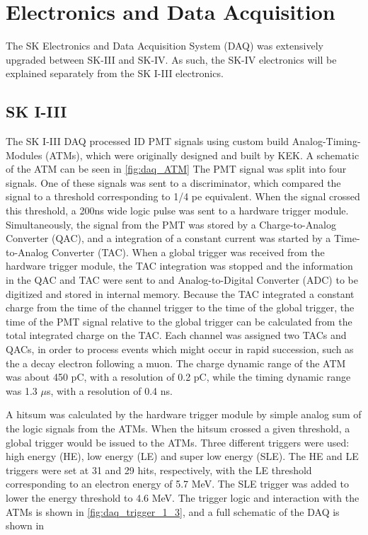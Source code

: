 \section{Electronics and Data Acquisition}
\label{sec:daq}
The SK Electronics and Data Acquisition System (DAQ) was extensively upgraded between SK-III and SK-IV.  As such, the SK-IV electronics will be explained separately from the SK I-III electronics.
\subsection{SK I-III}
\label{subsec:sk_1_3_daq}
The SK I-III DAQ processed ID PMT signals using custom build Analog-Timing-Modules (ATMs), which were originally designed and built by KEK.   A schematic of the ATM can be seen in \cref{fig:daq_ATM}  The PMT signal was split into four signals.  One of these signals was sent to a discriminator, which compared the signal to a threshold corresponding to 1/4 pe equivalent.  When the signal crossed this threshold, a 200ns wide logic pulse was sent to a hardware trigger module.  Simultaneously, the signal from the PMT was stored by a Charge-to-Analog Converter (QAC), and a integration of a constant current was started by a Time-to-Analog Converter (TAC).  When a global trigger was received from the hardware trigger module, the TAC integration was stopped and the information in the QAC and TAC were sent to and Analog-to-Digital Converter (ADC) to be digitized and stored in internal memory.  Because the TAC integrated a constant charge from the time of the channel trigger to the time of the global trigger, the time of the PMT signal relative to the global trigger can be calculated from the total integrated charge on the TAC.  Each channel was assigned two TACs and QACs, in order to process events which might occur in rapid succession, such as the a decay electron following a muon.  The charge dynamic range of the ATM was about 450 pC, with a resolution of 0.2 pC, while the timing dynamic range was 1.3 $\mu$s, with a resolution of 0.4 ns.\par
A hitsum was calculated by the hardware trigger module by simple analog sum of the logic signals from the ATMs.  When the hitsum crossed a given threshold, a global trigger would be issued to the ATMs.  Three different triggers were used: high energy (HE), low energy (LE) and super low energy (SLE).  The HE and LE triggers were set at 31 and 29 hits, respectively, with the LE threshold corresponding to an electron energy of 5.7 MeV.  The SLE trigger was added to lower the energy threshold to 4.6 MeV.  The trigger logic and interaction with the ATMs is shown in \cref{fig:daq_trigger_1_3}, and a full schematic of the DAQ is shown in         
